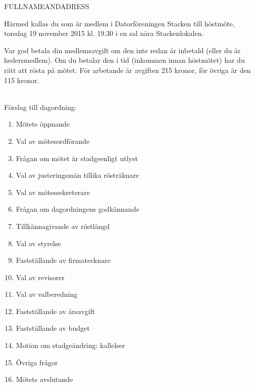 \documentclass[fontsize=11pt,enlargefirstpage,firstfoot=false,a4paper,pagenumber=no]{scrlttr2}
\begin{document}
 
\begin{letter}{FULLNAMEANDADRESS}

\opening{Härmed kallas du som är medlem i Datorföreningen Stacken till höstmöte, torsdag 19 november 2015 kl. 19.30 i en sal nära Stackenlokalen.}

Var god betala din medlemsavgift om den inte redan är inbetald (eller du är hedersmedlem). Om du betalar den i tid (inkommen innan höstmötet) har du rätt att rösta på mötet. För arbetande är avgiften 215 kronor, för övriga är den 115 kronor.

~\\
Förslag till dagordning:

\begin{multicols}{2}
\begin{enumerate}
	\itemsep0em
	\item  Mötets öppnande
	\item  Val av mötesordförande
	\item  Frågan om mötet är stadgeenligt utlyst
	\item  Val av justeringsmän tillika rösträknare
	\item  Val av mötessekreterare
	\item  Frågan om dagordningens godkännande
	\item  Tillkännagivande av röstlängd
	\item  Val av styrelse
	\item  Fastställande av firmatecknare
	\item  Val av revisorer
	\item  Val av valberedning
	\item  Fastställande av årsavgift
	\item  Fastställande av budget
	\item  Motion om stadgeändring: kallelser
	\item  Övriga frågor
	\item  Mötets avslutande
\end{enumerate}
\end{multicols}

\closing{}
\enlargethispage{3\baselineskip}

\end{letter}
\end{document}
